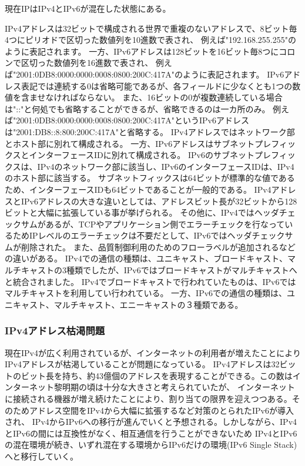 \documentclass[a4j]{jarticle}
\begin{document}
現在IPはIPv4とIPv6が混在した状態にある。

IPv4アドレスは32ビットで構成される世界で重複のないアドレスで、8ビット毎4つにピリオドで区切った数値列を10進数で表され、
例えば"192.168.255.255"のように表記されます。
一方、IPv6アドレスは128ビットを16ビット毎8つにコロンで区切った数値列を16進数で表され、
例えば"2001:0DB8:0000:0000:0008:0800:200C:417A"のように表記されます。
IPv6アドレス表記では連続する0は省略可能であるが、各フィールドに少なくとも1つの数値を含ませなければならない。
また、16ビットの0が複数連続している場合は"::"と何処でも省略することができるが、省略できるのは一カ所のみ。
例えば"2001:0DB8:0000:0000:0008:0800:200C:417A"というIPv6アドレスは"2001:DB8::8:800:200C:417A"と省略する。
IPv4アドレスではネットワーク部とホスト部に別れて構成される。
一方、IPv6アドレスはサブネットプレフィックスとインターフェースIDに別れて構成される。
IPv6のサブネットプレフィックスは、IPv4のネットワーク部に該当し、IPv6のインターフェースIDは、IPv4のホスト部に該当する。
サブネットフィックスは64ビットが標準的な値であるため、インターフェースIDも64ビットであることが一般的である。
IPv4アドレスとIPv6アドレスの大きな違いとしては、アドレスビット長が32ビットから128ビットと大幅に拡張している事が挙げられる。
その他に、IPv4ではヘッダチェックサムがあるが、TCPやアプリケーション側でエラーチェックを行なっているためIPレベルのエラーチェックは不要だとして、IPv6ではヘッダチェックサムが削除された。
また、品質制御利用のためのフローラベルが追加されるなどの違いがある。
IPv4での通信の種類は、ユニキャスト、ブロードキャスト、マルチキャストの3種類でしたが、IPv6ではブロードキャストがマルチキャストへと統合されました。
IPv4でブロードキャストで行われていたものは、IPv6ではマルチキャストを利用してい行われている。
一方、IPv6での通信の種類は、ユニキャスト、マルチキャスト、エニーキャストの３種類である。
\subsubsection{IPv4アドレス枯渇問題}
現在IPv4が広く利用されているが、インターネットの利用者が増えたことによりIPv4アドレスが枯渇していることが問題になっている。
IPv4アドレスは32ビットのビット長を持ち、約43億個のアドレスを表現することができる。この数はインターネット黎明期の頃は十分な大きさと考えられていたが、
インターネットに接続される機器が増え続けたことにより、割り当ての限界を迎えつつある。そのためアドレス空間をIPv4から大幅に拡張するなど対策のとられたIPv6が導入され、
IPv4からIPv6への移行が進んでいくと予想される。しかしながら、IPv4とIPv6の間には互換性がなく、相互通信を行うことができないため
IPv4とIPv6の混在環境が続き、いずれ混在する環境からIPv6だけの環境(IPv6 Single Stack)へと移行していく。
\end{document}
